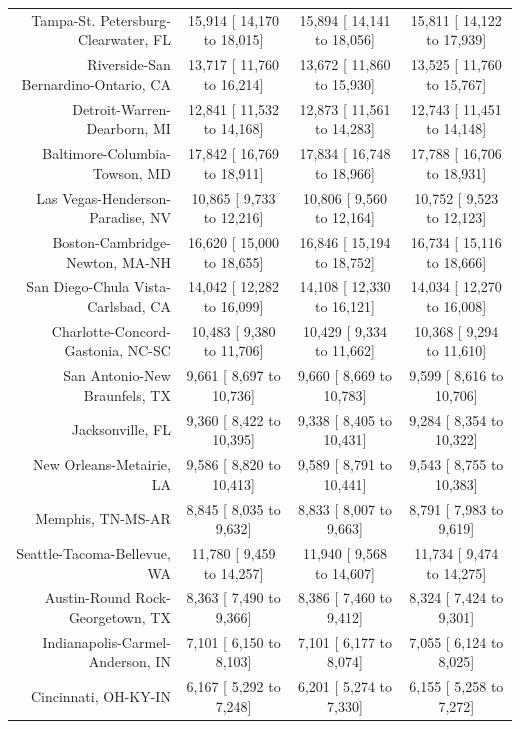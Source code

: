\documentclass{article}
\begin{document}
\begin{table}[H]
\begin{tabular}{|r|c|c|c|}
		Tampa-St. Petersburg-Clearwater, FL &  15,914 [ 14,170 to  18,015] &  15,894 [ 14,141 to  18,056] &  15,811 [ 14,122 to  17,939]\\
		Riverside-San Bernardino-Ontario, CA &  13,717 [ 11,760 to  16,214] &  13,672 [ 11,860 to  15,930] &  13,525 [ 11,760 to  15,767]\\
		Detroit-Warren-Dearborn, MI &  12,841 [ 11,532 to  14,168] &  12,873 [ 11,561 to  14,283] &  12,743 [ 11,451 to  14,148]\\
		Baltimore-Columbia-Towson, MD &  17,842 [ 16,769 to  18,911] &  17,834 [ 16,748 to  18,966] &  17,788 [ 16,706 to  18,931]\\
		Las Vegas-Henderson-Paradise, NV &  10,865 [  9,733 to  12,216] &  10,806 [  9,560 to  12,164] &  10,752 [  9,523 to  12,123]\\
		Boston-Cambridge-Newton, MA-NH &  16,620 [ 15,000 to  18,655] &  16,846 [ 15,194 to  18,752] &  16,734 [ 15,116 to  18,666]\\
		San Diego-Chula Vista-Carlsbad, CA &  14,042 [ 12,282 to  16,099] &  14,108 [ 12,330 to  16,121] &  14,034 [ 12,270 to  16,008]\\
		Charlotte-Concord-Gastonia, NC-SC &  10,483 [  9,380 to  11,706] &  10,429 [  9,334 to  11,662] &  10,368 [  9,294 to  11,610]\\
		San Antonio-New Braunfels, TX &   9,661 [  8,697 to  10,736] &   9,660 [  8,669 to  10,783] &   9,599 [  8,616 to  10,706]\\
		Jacksonville, FL &   9,360 [  8,422 to  10,395] &   9,338 [  8,405 to  10,431] &   9,284 [  8,354 to  10,322]\\
		New Orleans-Metairie, LA &   9,586 [  8,820 to  10,413] &   9,589 [  8,791 to  10,441] &   9,543 [  8,755 to  10,383]\\
		Memphis, TN-MS-AR &   8,845 [  8,035 to   9,632] &   8,833 [  8,007 to   9,663] &   8,791 [  7,983 to   9,619]\\
		Seattle-Tacoma-Bellevue, WA &  11,780 [  9,459 to  14,257] &  11,940 [  9,568 to  14,607] &  11,734 [  9,474 to  14,275]\\
		Austin-Round Rock-Georgetown, TX &   8,363 [  7,490 to   9,366] &   8,386 [  7,460 to   9,412] &   8,324 [  7,424 to   9,301]\\
		Indianapolis-Carmel-Anderson, IN &   7,101 [  6,150 to   8,103] &   7,101 [  6,177 to   8,074] &   7,055 [  6,124 to   8,025]\\
		Cincinnati, OH-KY-IN &   6,167 [  5,292 to   7,248] &   6,201 [  5,274 to   7,330] &   6,155 [  5,258 to   7,272]\\

\end{tabular}
\end{table}
\end{document}
